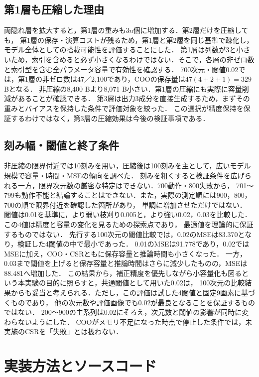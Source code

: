 \documentclass[a4paper,11pt]{article}
\begin{document}
\subsection{第1層も圧縮した理由}

両隠れ層を拡大すると，第1層の重みも$3n$個に増加する．第2層だけを圧縮しても，
第1層の保存・演算コストが残るため，第1層と第2層を同じ基準で疎化し，モデル全体としての搭載可能性を評価することにした．
第1層は列数が3と小さいため，索引を含めると必ず小さくなるわけではない．そこで，各層の非ゼロ数と索引型を含む全パラメータ容量で有効性を確認する．
700次元・閾値0.02では，第1層の非ゼロ数は47／2,100であり，COOの保存量は$47(4+2+1)=329$ Bとなる．
非圧縮の8,400 Bより8,071 B小さい．第1層の圧縮にも実際に容量削減があることが確認できる．
第3層は出力3成分を直接生成するため，まずその重みとバイアスを保持した条件で評価対象を絞った．
この選択が精度保持を保証するわけではなく，第3層の圧縮効果は今後の検証事項である．

\subsection{刻み幅・閾値と終了条件}

非圧縮の限界付近では10刻みを用い，圧縮後は100刻みを主として，広いモデル規模で容量・時間・MSEの傾向を調べた．
刻みを粗くすると検証条件を広げられる一方，限界次元数の厳密な特定はできない．700動作・800失敗から，
701〜799も動作不能と結論することはできない．また，実際の測定順には900，800，700の順で限界付近を確認した箇所があり，
単調に増加させただけではない．
閾値は0.01を基準に，より弱い枝刈り0.005と，より強い0.02，0.03を比較した．この4値は精度と容量の変化を見るための探索点であり，
最適値を理論的に保証するものではない．
先行する100次元の閾値比較では，0.02のMSEは83.370となり，検証した4閾値の中で最小であった．
0.01のMSEは91.778であり，0.02ではMSEに加え，COO・CSRともに保存容量と推論時間も小さくなった．
一方，0.03まで閾値を上げると保存容量と推論時間はさらに減少したものの，MSEは88.481へ増加した．
この結果から，補正精度を優先しながら小容量化も図るという本実験の目的に照らすと，共通閾値として用いた0.02は，
100次元の比較結果からも妥当と考えられる．ただし，この評価は試した4閾値と固定9画素に基づくものであり，
他の次元数や評価画像でも0.02が最良となることを保証するものではない．
200〜900の主系列は0.02にそろえ，次元数と閾値の影響が同時に変わらないようにした．
COOがメモリ不足になった時点で停止した条件では，未実施のCSRを「失敗」とは扱わない．

\section{実装方法とソースコード}
\end{document}
